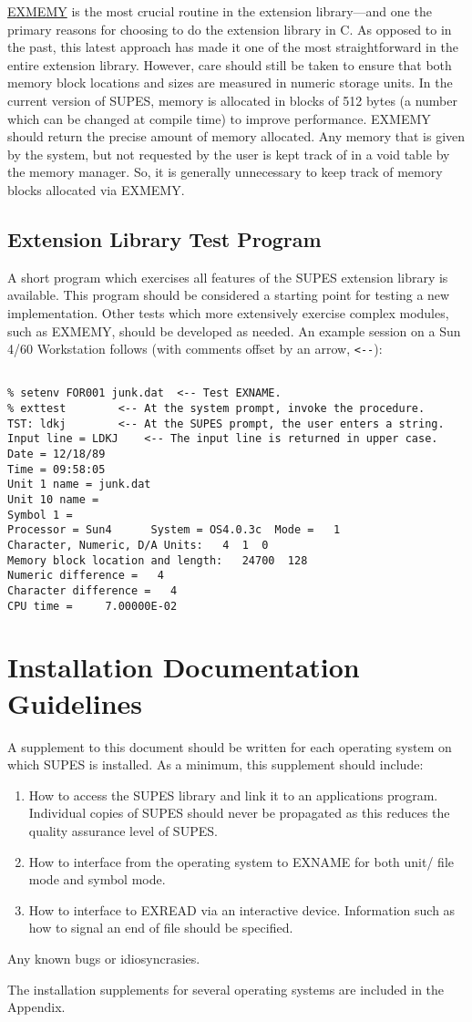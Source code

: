 \underline{EXMEMY} is the most crucial routine in the extension
library---and one the primary reasons for choosing to do the extension
library in C.
As opposed to in the past,
this latest approach has made it one of the most straightforward in
the entire extension library.
However, care should still be
taken to ensure that both memory block locations and sizes are measured in
numeric storage units.
In the current version of SUPES,
memory is allocated in blocks of 512 bytes
(a number which can be changed at compile time)
to improve performance.
EXMEMY should return the precise amount of
memory allocated.
Any memory that is given by the system,
but not requested by the user is kept track of in a void table
by the memory manager.
So, it is generally unnecessary to keep track of memory
blocks allocated via EXMEMY.

\subsection{Extension Library Test Program}
A short program which exercises all features of the SUPES extension
library is available.  This program should be considered a starting point
for testing a new implementation.  Other tests which more extensively
exercise complex modules, such as EXMEMY, should be developed as needed.
An example session on a Sun 4/60 Workstation follows (with comments offset by
an arrow, \verb+<--+):
\begin{verbatim}

% setenv FOR001 junk.dat  <-- Test EXNAME.
% exttest        <-- At the system prompt, invoke the procedure.
TST: ldkj        <-- At the SUPES prompt, the user enters a string.
Input line = LDKJ    <-- The input line is returned in upper case.
Date = 12/18/89
Time = 09:58:05
Unit 1 name = junk.dat
Unit 10 name =
Symbol 1 =
Processor = Sun4      System = OS4.0.3c  Mode =   1
Character, Numeric, D/A Units:   4  1  0
Memory block location and length:   24700  128
Numeric difference =   4
Character difference =   4
CPU time =     7.00000E-02

\end{verbatim}

\section{Installation Documentation Guidelines}
A supplement to this document should be written for each operating system on
which SUPES is installed.  As a minimum, this supplement should include:
\begin{enumerate}
\item How to access the SUPES library and link it to an applications
        program.  Individual copies of SUPES should never be propagated as
        this reduces the quality assurance level of SUPES.

\item How to interface from the operating system to EXNAME for both unit/
        file mode and symbol mode.

\item How to interface to EXREAD via an interactive device.  Information
        such as how to signal an end of file should be specified.
\end{enumerate}

Any known bugs or idiosyncrasies.

The installation supplements for several operating systems are included in
the Appendix.
